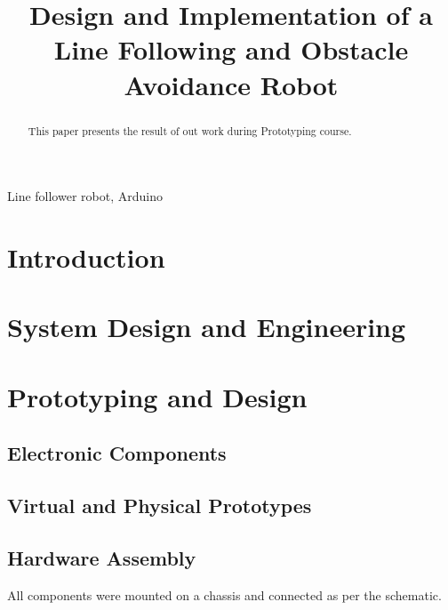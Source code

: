 \documentclass[conference]{IEEEtran}
\begin{document}
\title{Design and Implementation of a Line Following and Obstacle Avoidance Robot}

\author{
}

\maketitle

\begin{abstract}
This paper presents the result of out work during Prototyping course.
\end{abstract}

\begin{IEEEkeywords}
Line follower robot, Arduino
\end{IEEEkeywords}

\section{Introduction}

\section{System Design and Engineering}

\section{Prototyping and Design}

\subsection{Electronic Components}

\subsection{Virtual and Physical Prototypes}


\subsection{Hardware Assembly}
All components were mounted on a chassis and connected as per the schematic.
\end{document}
